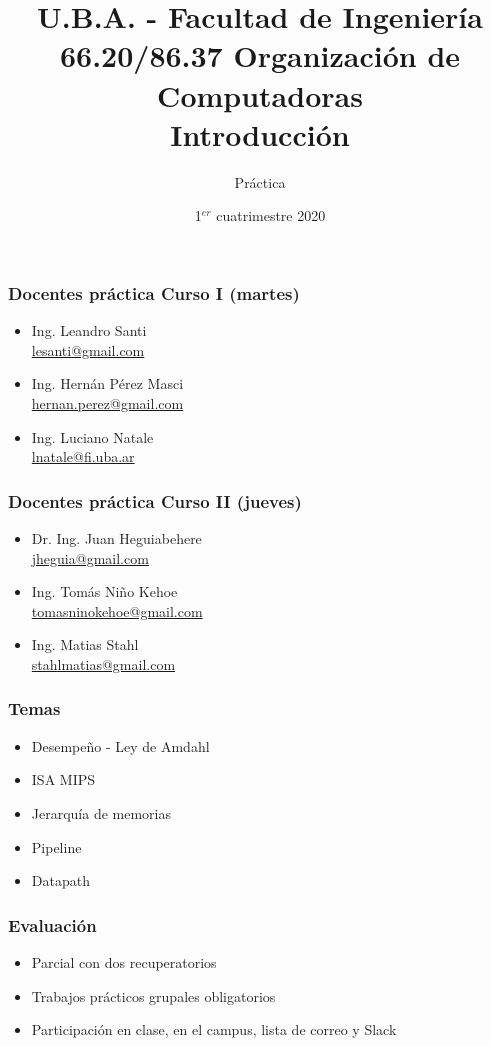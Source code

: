 \documentclass{beamer}
\title[66.20/86.37]{U.B.A. - Facultad de Ingeniería\\\vspace{0.25cm} 66.20/86.37 Organización de Computadoras
  \\Introducción}
\author{Práctica}
\date{1$^{er}$ cuatrimestre 2020}
\begin{document}
\begin{frame}
\titlepage %
\end{frame}

\begin{frame}
 \frametitle{Docentes práctica Curso I (martes)}
 \begin{itemize}
  \item Ing. Leandro Santi\\ \href{mailto:lesanti@gmail.com}{lesanti@gmail.com}
  \item Ing. Hernán Pérez Masci\\ \href{hernan.perez@gmail.com}{hernan.perez@gmail.com}
  \item Ing. Luciano Natale\\ \href{lnatale@fi.uba.ar}{lnatale@fi.uba.ar}
 \end{itemize}
\end{frame}

\begin{frame}
 \frametitle{Docentes práctica Curso II (jueves)}
 \begin{itemize}
  \item Dr. Ing. Juan Heguiabehere\\ \href{mailto:jheguia@gmail.com}{jheguia@gmail.com}
  \item Ing. Tomás Niño Kehoe\\ \href{tomasninokehoe@gmail.com}{tomasninokehoe@gmail.com}
  \item Ing. Matias Stahl\\ \href{stahlmatias@gmail.com}{stahlmatias@gmail.com}
 \end{itemize}
\end{frame}

 \begin{frame}
 \frametitle{Temas}
 \begin{itemize}
  \item Desempeño - Ley de Amdahl
  \item ISA MIPS
  \item Jerarquía de memorias
  \item Pipeline
  \item Datapath
\end{itemize}
 \end{frame}

 \begin{frame}
 \frametitle{Evaluación}
 \begin{itemize}
\item Parcial con dos recuperatorios
\item Trabajos prácticos grupales obligatorios
\item Participación en clase, en el campus, lista de correo y Slack
\end{itemize}
 \end{frame}
\end{document}
